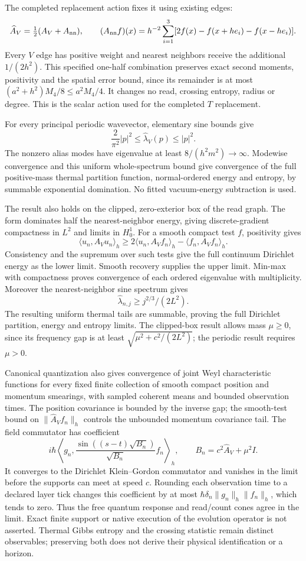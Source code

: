The completed replacement action fixes it using existing edges:
\[
 \widehat A_V=\tfrac12(A_V+A_{\rm nn}),\qquad
 (A_{\rm nn}f)(x)=h^{-2}\sum_{i=1}^3
       [2f(x)-f(x+he_i)-f(x-he_i)].
\]
Every $V$ edge has positive weight and nearest neighbors receive the additional
$1/(2h^2)$. This specified one-half combination preserves exact second moments,
positivity and the spatial error bound, since its remainder is at most
$(a^2+h^2)M_4/8\le a^2M_4/4$. It changes no read, crossing entropy, radius or
degree. This is the scalar action used for the completed $T$ replacement.

For every principal periodic wavevector, elementary sine bounds give
\[
 \frac{2}{\pi^2}|p|^2\le\widehat\lambda_V(p)\le|p|^2.
\]
The nonzero alias modes have eigenvalue at least $8/(h^2m^2)\to\infty$.
Modewise convergence and this uniform whole-spectrum bound give convergence
of the full positive-mass thermal partition function, normal-ordered energy
and entropy, by summable exponential domination. No fitted vacuum-energy
subtraction is used.

The result also holds on the clipped, zero-exterior box of the read graph.
The form dominates half the nearest-neighbor energy, giving discrete-gradient
compactness in $L^2$ and limits in $H_0^1$. For a smooth compact test $f$,
positivity gives
\[
 \langle u_n,A_Vu_n\rangle_h\ge
  2\langle u_n,A_Vf_n\rangle_h-\langle f_n,A_Vf_n\rangle_h.
\]
Consistency and the supremum over such tests give the full continuum
Dirichlet energy as the lower limit. Smooth recovery supplies the upper
limit. Min-max with compactness proves convergence of each ordered eigenvalue
with multiplicity. Moreover the nearest-neighbor sine spectrum gives
\[
 \widehat\lambda_{n,j}\ge j^{2/3}/(2L^2).
\]
The resulting uniform thermal tails are summable, proving the full Dirichlet
partition, energy and entropy limits. The clipped-box result allows mass
$\mu\ge0$, since its frequency gap is at least
$\sqrt{\mu^2+c^2/(2L^2)}$; the periodic result requires $\mu>0$.

Canonical quantization also gives convergence of joint Weyl characteristic
functions for every fixed finite collection of smooth compact position and
momentum smearings, with sampled coherent means and bounded observation times.
The position covariance is bounded by the inverse gap; the smooth-test bound
on $\|\widehat A_Vf_n\|_h$ controls the unbounded momentum covariance tail.
The field commutator has coefficient
\[
 i\hbar\left\langle g_n,
 \frac{\sin((s-t)\sqrt{B_n})}{\sqrt{B_n}}f_n\right\rangle_h,
 \qquad B_n=c^2\widehat A_V+\mu^2I.
\]
It converges to the Dirichlet Klein--Gordon commutator and vanishes in the
limit before the supports can meet at speed $c$. Rounding each observation
time to a declared layer tick changes this coefficient by at most
$\hbar\delta_n\|g_n\|_h\|f_n\|_h$, which tends to zero. Thus the free
quantum response and read/count cones agree in the limit. Exact finite
support or native execution of the evolution operator is not asserted.
Thermal Gibbs entropy and the crossing statistic remain distinct observables;
preserving both does not derive their physical identification or a horizon.

